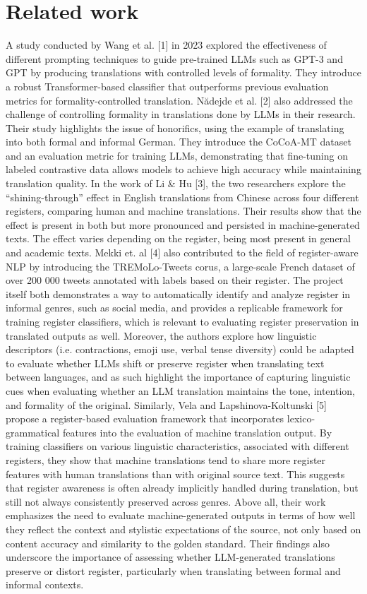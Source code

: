 \documentclass[fleqn,moreauthors,10pt]{ds_report}
\begin{document}
	\section*{Related work}
	A study conducted by Wang et al. [1] in 2023 explored the effectiveness of different prompting techniques to guide pre-trained LLMs such as GPT-3 and GPT by producing translations with controlled levels of formality. They introduce a robust Transformer-based classifier that outperforms previous evaluation metrics for formality-controlled translation. N\u{a}dejde et al. [2] also addressed the challenge of controlling formality in translations done by LLMs in their research. Their study highlights the issue of honorifics, using the example of translating \grqq into both formal and informal German. They introduce the CoCoA-MT dataset and an evaluation metric for training LLMs, demonstrating that fine-tuning on labeled contrastive data allows models to achieve high accuracy while maintaining translation quality. 
	In the work of Li \& Hu [3], the two researchers explore the “shining-through” effect in English translations from Chinese across four different registers, comparing human and machine translations. Their results show that the effect is present in both but more pronounced and persisted in machine-generated texts. The effect varies depending on the register, being most present in general and academic texts. 
	Mekki et. al [4] also contributed to the field of register-aware NLP by introducing the TREMoLo-Tweets corus, a large-scale French dataset of over 200 000 tweets annotated with labels based on their register. The project itself both demonstrates a way to automatically identify and analyze register in informal genres, such as social media, and provides a replicable framework for training register classifiers, which is relevant to evaluating register preservation in translated outputs as well. Moreover, the authors explore how linguistic descriptors (i.e. contractions, emoji use, verbal tense diversity) could be adapted to evaluate whether LLMs shift or preserve register when translating text between languages, and as such highlight the importance of capturing linguistic cues when evaluating whether an LLM translation maintains the tone, intention, and formality of the original.
	Similarly, Vela and Lapshinova-Koltunski [5] propose a register-based evaluation framework that incorporates lexico-grammatical features into the evaluation of machine translation output. By training classifiers on various linguistic characteristics, associated with different registers, they show that machine translations tend to share more register features with human translations than with original source text. This suggests that register awareness is often already implicitly handled during translation, but still not always consistently preserved across genres. Above all, their work emphasizes the need to evaluate machine-generated outputs in terms of how well they reflect the context and stylistic expectations of the source, not only based on content accuracy and similarity to the golden standard. Their findings also underscore the importance of assessing whether LLM-generated translations preserve or distort register, particularly when translating between formal and informal contexts.
	
\end{document}
